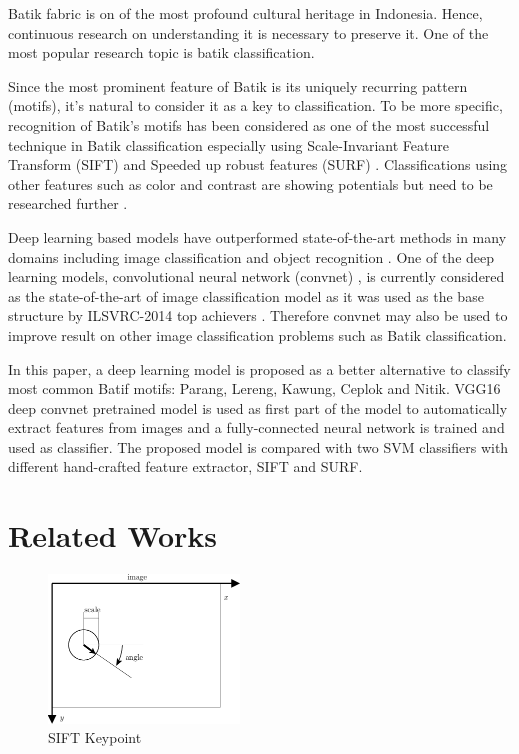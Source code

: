 \documentclass[conference]{IEEEtran}
\begin{document}
Batik fabric is on of the most profound cultural heritage in Indonesia. Hence, continuous research on understanding it is necessary to preserve it. One of the most popular research topic is batik classification.

Since the most prominent feature of Batik is its uniquely recurring pattern (motifs), it's natural to consider it as a key to classification. To be more specific, recognition of Batik's motifs has been considered as one of the most successful technique in Batik classification especially using Scale-Invariant Feature Transform (SIFT) \cite{azhar2015batik} \cite{nurhaida2015automatic} and Speeded up robust features (SURF) \cite{willy2013evaluation}. Classifications using other features such as color and contrast are showing potentials but need to be researched further \cite{moertini2005algorithms}.

Deep learning based models have outperformed state-of-the-art methods in many domains including image classification and object recognition \cite{lecun2015deep}. One of the deep learning models, convolutional neural network (convnet) \cite{lecun1998gradient}, is currently considered as the state-of-the-art of image classification model as it was used as the base structure by ILSVRC-2014 top achievers \cite{simonyan2014very}. Therefore convnet may also be used to improve result on other image classification problems such as Batik classification.

In this paper, a deep learning model is proposed as a better alternative to classify most common Batif motifs: Parang, Lereng, Kawung, Ceplok and Nitik. VGG16 deep convnet pretrained model \cite{simonyan2014very} is used as first part of the model to automatically extract features from images and a fully-connected neural network is trained and used as classifier. The proposed model is compared with two SVM classifiers with different hand-crafted feature extractor, SIFT and SURF.

\section{Related Works}

\begin{figure}[!b]
\centering
\includegraphics[width=2.0in]{sift-keypoint}
\caption{SIFT Keypoint}
\label{fig_keypoint}
\end{figure}
\end{document}
